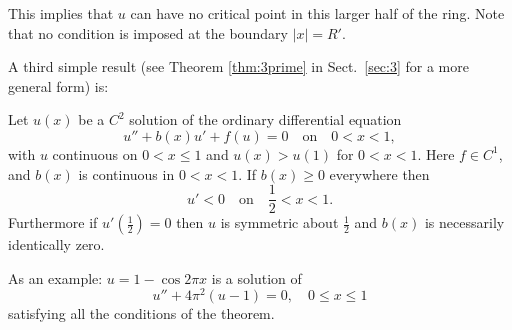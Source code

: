 This implies that $u$ can have no critical point in this larger half of the ring. 
Note that no condition is imposed at the boundary $|x|=R'$.

A third simple result (see Theorem \ref{thm:3prime} in Sect.~\ref{sec:3}
for a more general form) is:

\begin{theorem}\label{thm:3}
  Let $u(x)$ be a $C^2$ solution of the ordinary differential equation
  \begin{equation}\label{eq:1.3}
    u'' + b(x)u' + f(u) = 0\quad \text{on} \quad 0<x<1,
  \end{equation}
  with $u$ continuous on $0<x\leq 1$ and $u(x)>u(1)$ for $0<x<1$.
  Here $f\in C^1$, and $b(x)$ is continuous in $0<x<1$.
  If $b(x)\geq 0$ everywhere then
  \begin{equation}\label{eq:1.4}
    u' < 0\quad \text{on} \quad \frac12 < x < 1.
  \end{equation}
  Furthermore if $u'(\frac12) = 0$ then $u$ is symmetric about $\frac12$
  and $b(x)$ is necessarily identically zero.
\end{theorem}

As an example: $u = 1 - \cos 2\pi x$ is a solution of
\[u'' + 4\pi^2(u-1) = 0, \quad 0\leq x\leq 1\]
satisfying all the conditions of the theorem.

